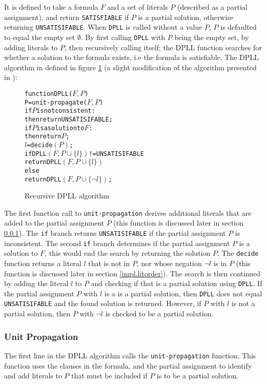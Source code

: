 It is defined to take a formula $F$ and a set of literals $P$ (described as a partial assignment), and return \verb+SATISFIABLE+ if $P$ is a partial solution, 
otherwise returning \verb+UNSATISIFABLE+.
When \texttt{DPLL} is called without a value $P$, $P$ is defaulted to equal the empty set $\emptyset$.
By first calling \texttt{DPLL} with $P$ being the empty set, by adding literals to $P$, then recursively calling itself; 
the DPLL function searches for whether a solution to the formula exists, 
i.e the formula is satisfiable.
The DPLL algorithm in defined in figure \ref{impl.DPLL} (a slight modification of the algorithm presented in \citep{dixon2004automating}):
\begin{figure}[h]
\begin{center}
\begin{alltt}
function DPLL(\(F, P\))
   P = unit-propagate(\(F, P\))
   if \(P\) is not consistent:
       then return UNSATISIFABLE;
   if \(P\) is a solution to \(F\):
       then return \(P\);
   \(l\) = decide\((P)\);
   if DPLL\((F, P \cup \{l\})\) != UNSATISIFABLE 
       return DPLL\((F, P \cup \{l\})\)
   else
       return DPLL\((F, P \cup \{\neg l\})\);
\end{alltt}
  \caption{Recursive DPLL algorithm}
  \label{impl.DPLL}
\end{center}
\end{figure}

The first function call to \texttt{unit-propagation} derives additional literals that are added to the partial assignment $P$ (this function is discussed later in section \ref{impl.unit}).
The \verb+if+ branch returns \texttt{UNSATISIFABLE} if the partial assignment $P$ is inconsistent.
The second \verb+if+ branch determines if the partial assignment $P$ is a solution to $F$, this would end the search by returning the solution $P$.
The \texttt{decide} function returns a literal $l$ that is not in $P$, nor whose negation $\neg l$ is in $P$ (this function is discussed later in section \ref{impl.litorder}).
The search is then continued by adding the literal $l$ to $P$ and checking if that is a partial solution using \texttt{DPLL}.
If the partial assignment $P$ with $l$ is a is a partial solution, then \texttt{DPLL} does not equal \texttt{UNSATISIFABLE} and the found solution is returned.
However, if $P$ with $l$ is not a partial solution, then $P$ with $\neg l$ is checked to be a partial solution.

\subsubsection{Unit Propagation}
\label{impl.unit}
The first line in the  DPLL algorithm calls the \texttt{unit-propagation} function.
This function uses the clauses in the formula, and the partial assignment to identify and add literals to $P$ that must be included if $P$ is to be a partial solution.

